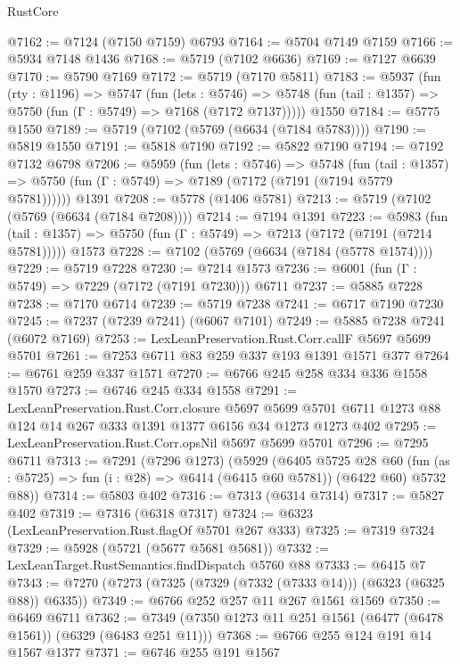 \begin{lexlean}{RustCore}
\begin{coremodule}
{\begin{coremodule}
{{{{{{{{{{{{{{{{{{{{{{{{{{{{{{{{{{{{{{{{{{{{@7162 := @7124 (@7150 @7159) @6793
@7164 := @5704 @7149 @7159
@7166 := @5934 @7148 @1436
@7168 := @5719 (@7102 @6636)
@7169 := @7127 @6639
@7170 := @5790 @7169
@7172 := @5719 (@7170 @5811)
@7183 := @5937
    (fun (rty : @1196) =>
    @5747
      (fun (lets : @5746) =>
      @5748 (fun (tail : @1357) => @5750 (fun (Γ : @5749) => @7168 (@7172 @7137)))))
    @1550
@7184 := @5775 @1550
@7189 := @5719 (@7102 (@5769 (@6634 (@7184 @5783))))
@7190 := @5819 @1550
@7191 := @5818 @7190
@7192 := @5822 @7190
@7194 := @7192 @7132 @6798
@7206 := @5959
    (fun (lets : @5746) =>
    @5748
      (fun (tail : @1357) => @5750 (fun (Γ : @5749) => @7189 (@7172 (@7191 (@7194 @5779 @5781))))))
    @1391
@7208 := @5778 (@1406 @5781)
@7213 := @5719 (@7102 (@5769 (@6634 (@7184 @7208))))
@7214 := @7194 @1391
@7223 := @5983
    (fun (tail : @1357) => @5750 (fun (Γ : @5749) => @7213 (@7172 (@7191 (@7214 @5781)))))
    @1573
@7228 := @7102 (@5769 (@6634 (@7184 (@5778 @1574))))
@7229 := @5719 @7228
@7230 := @7214 @1573
@7236 := @6001 (fun (Γ : @5749) => @7229 (@7172 (@7191 @7230))) @6711
@7237 := @5885 @7228
@7238 := @7170 @6714
@7239 := @5719 @7238
@7241 := @6717 @7190 @7230
@7245 := @7237 (@7239 @7241) (@6067 @7101)
@7249 := @5885 @7238 @7241 (@6072 @7169)
@7253 := LexLeanPreservation.Rust.Corr.callF @5697 @5699 @5701
@7261 := @7253 @6711 @83 @259 @337 @193 @1391 @1571 @377
@7264 := @6761 @259 @337 @1571
@7270 := @6766 @245 @258 @334 @336 @1558 @1570
@7273 := @6746 @245 @334 @1558
@7291 := LexLeanPreservation.Rust.Corr.closure
    @5697
    @5699
    @5701
    @6711
    @1273
    @88
    @124
    @14
    @267
    @333
    @1391
    @1377
    @6156
    @34
    @1273
    @1273
    @402
@7295 := LexLeanPreservation.Rust.Corr.opsNil @5697 @5699 @5701
@7296 := @7295 @6711
@7313 := @7291
    (@7296 @1273)
    (@5929
      (@6405
        @5725
        @28
        @60
        (fun (as : @5725) => fun (i : @28) => @6414 (@6415 @60 @5781))
        (@6422 @60)
        @5732
        @88))
@7314 := @5803 @402
@7316 := @7313 (@6314 @7314)
@7317 := @5827 @402
@7319 := @7316 (@6318 @7317)
@7324 := @6323 (LexLeanPreservation.Rust.flagOf @5701 @267 @333)
@7325 := @7319 @7324
@7329 := @5928 (@5721 (@5677 @5681 @5681))
@7332 := LexLeanTarget.RustSemantics.findDispatch @5760 @88
@7333 := @6415 @7
@7343 := @7270 (@7273 (@7325 (@7329 (@7332 (@7333 @14))) (@6323 (@6325 @88)) @6335))
@7349 := @6766 @252 @257 @11 @267 @1561 @1569
@7350 := @6469 @6711
@7362 := @7349 (@7350 @1273 @11 @251 @1561 (@6477 (@6478 @1561)) (@6329 (@6483 @251 @11)))
@7368 := @6766 @255 @124 @191 @14 @1567 @1377
@7371 := @6746 @255 @191 @1567
}}}}}}}}}}}}}}}}}}}}}}}}}}}}}}}}}}}}}}}}}}}}
\end{coremodule}}
\end{coremodule}
\end{lexlean}
